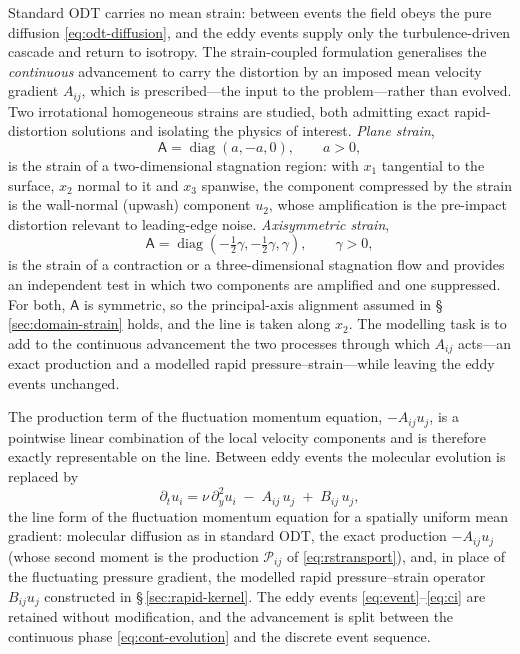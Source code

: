 \documentclass[lineno]{JFM-FLM_Au}
\begin{document}
Standard ODT carries no mean strain: between events the field obeys the
pure diffusion \eqref{eq:odt-diffusion}, and the eddy events supply only
the turbulence-driven cascade and return to isotropy. The strain-coupled
formulation generalises the \emph{continuous} advancement to carry the
distortion by an imposed mean velocity gradient $A_{ij}$, which is
prescribed---the input to the problem---rather than evolved. Two
irrotational homogeneous strains are studied, both admitting exact
rapid-distortion solutions and isolating the physics of interest.
\emph{Plane strain},
\begin{equation}
  \mathsf{A}=\operatorname{diag}(a,-a,0),\qquad a>0,
  \label{eq:plane-strain}
\end{equation}
is the strain of a two-dimensional stagnation region: with $x_1$
tangential to the surface, $x_2$ normal to it and $x_3$ spanwise, the
component compressed by the strain is the wall-normal (upwash) component
$u_2$, whose amplification is the pre-impact distortion relevant to
leading-edge noise. \emph{Axisymmetric strain},
\begin{equation}
  \mathsf{A}=\operatorname{diag}(-\tfrac12\gamma,-\tfrac12\gamma,\gamma),
  \qquad \gamma>0,
  \label{eq:axi-strain}
\end{equation}
is the strain of a contraction or a three-dimensional stagnation flow and
provides an independent test in which two components are amplified and
one suppressed. For both, $\mathsf{A}$ is symmetric, so the
principal-axis alignment assumed in \S\,\ref{sec:domain-strain} holds,
and the line is taken along $x_2$. The modelling task is to add to the
continuous advancement the two processes through which $A_{ij}$
acts---an exact production and a modelled rapid pressure--strain---while
leaving the eddy events unchanged.

The production term of the fluctuation momentum equation, $-A_{ij}u_j$,
is a pointwise linear combination of the local velocity components and is
therefore exactly representable on the line. Between eddy events the
molecular evolution is replaced by
\begin{equation}
  \partial_t u_i
  = \nu\,\partial_y^2 u_i \;-\; A_{ij}\,u_j \;+\; B_{ij}\,u_j,
  \label{eq:cont-evolution}
\end{equation}
the line form of the fluctuation momentum equation for a spatially
uniform mean gradient: molecular diffusion as in standard ODT, the
exact production $-A_{ij}u_j$ (whose second moment is the production
$\mathcal{P}_{ij}$ of \eqref{eq:rstransport}), and, in place of the
fluctuating pressure gradient, the modelled rapid pressure--strain
operator $B_{ij}u_j$ constructed in \S\,\ref{sec:rapid-kernel}. The
eddy events \eqref{eq:event}--\eqref{eq:ci} are retained without
modification, and the advancement is split between the continuous phase
\eqref{eq:cont-evolution} and the discrete event sequence.
\end{document}

